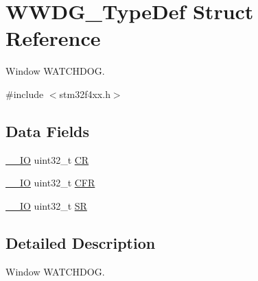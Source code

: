 \hypertarget{struct_w_w_d_g___type_def}{\section{W\-W\-D\-G\-\_\-\-Type\-Def Struct Reference}
\label{struct_w_w_d_g___type_def}
}


Window W\-A\-T\-C\-H\-D\-O\-G.  




{\ttfamily \#include $<$stm32f4xx.\-h$>$}

\subsection*{Data Fields}
\begin{DoxyCompactItemize}
\item 
\hyperlink{group___c_m_s_i_s__core__definitions_gaec43007d9998a0a0e01faede4133d6be}{\-\_\-\-\_\-\-I\-O} uint32\-\_\-t \hyperlink{struct_w_w_d_g___type_def_ab40c89c59391aaa9d9a8ec011dd0907a}{C\-R}
\item 
\hyperlink{group___c_m_s_i_s__core__definitions_gaec43007d9998a0a0e01faede4133d6be}{\-\_\-\-\_\-\-I\-O} uint32\-\_\-t \hyperlink{struct_w_w_d_g___type_def_ac011ddcfe531f8e16787ea851c1f3667}{C\-F\-R}
\item 
\hyperlink{group___c_m_s_i_s__core__definitions_gaec43007d9998a0a0e01faede4133d6be}{\-\_\-\-\_\-\-I\-O} uint32\-\_\-t \hyperlink{struct_w_w_d_g___type_def_af6aca2bbd40c0fb6df7c3aebe224a360}{S\-R}
\end{DoxyCompactItemize}


\subsection{Detailed Description}
Window W\-A\-T\-C\-H\-D\-O\-G. 

